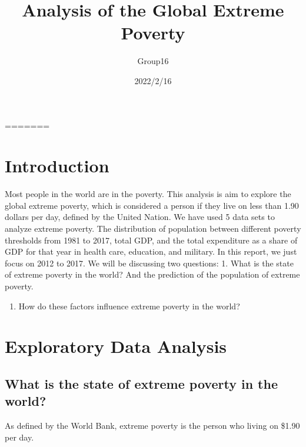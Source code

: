 \documentclass[
]{article}
\title{Analysis of the Global Extreme Poverty}
\author{Group16}
\date{2022/2/16}
\providecommand{\tightlist}{%
  \setlength{\itemsep}{0pt}\setlength{\parskip}{0pt}}
\begin{document}
\maketitle

=======

\hypertarget{introduction}{%
\section{Introduction}\label{introduction}}

Most people in the world are in the poverty. This analysis is aim to
explore the global extreme poverty, which is considered a person if they
live on less than 1.90 dollars per day, defined by the United Nation. We
have used 5 data sets to analyze extreme poverty. The distribution of
population between different poverty thresholds from 1981 to 2017, total
GDP, and the total expenditure as a share of GDP for that year in health
care, education, and military. In this report, we just focus on 2012 to
2017. We will be discussing two questions: 1. What is the state of
extreme poverty in the world? And the prediction of the population of
extreme poverty.

\begin{enumerate}
\def\labelenumi{\arabic{enumi}.}
\setcounter{enumi}{1}
\tightlist
\item
  How do these factors influence extreme poverty in the world?
\end{enumerate}

\hypertarget{exploratory-data-analysis}{%
\section{Exploratory Data Analysis}\label{exploratory-data-analysis}}

\hypertarget{what-is-the-state-of-extreme-poverty-in-the-world}{%
\subsection{What is the state of extreme poverty in the
world?}\label{what-is-the-state-of-extreme-poverty-in-the-world}}

As defined by the World Bank, extreme poverty is the person who living
on \$1.90 per day.
\end{document}
